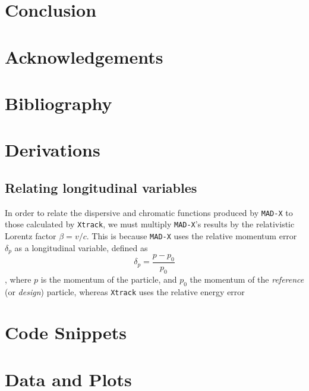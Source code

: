 \documentclass[11pt]{report}
\begin{document}
\chapter{Conclusion}

\chapter{Acknowledgements}

\chapter{Bibliography}

\nocite{*}

\begin{appendices}

\chapter{Derivations}

\section{Relating longitudinal variables}

In order to relate the dispersive and chromatic functions produced by \verb|MAD-X| to those calculated by \verb|Xtrack|, we must multiply \verb|MAD-X|'s results by the relativistic Lorentz factor $\beta=v/c$. This is because \verb|MAD-X| uses the relative momentum error $\delta_p$ as a longitudinal variable, defined as
\begin{equation}
\delta_p=\frac{p-p_0}{p_0}
\end{equation}, where $p$ is the momentum of the particle, and $p_0$ the momentum of the {\it reference} (or {\it design}) particle, whereas \verb|Xtrack| uses the relative energy error

\chapter{Code Snippets}

\chapter{Data and Plots}

\end{appendices}
\end{document}
